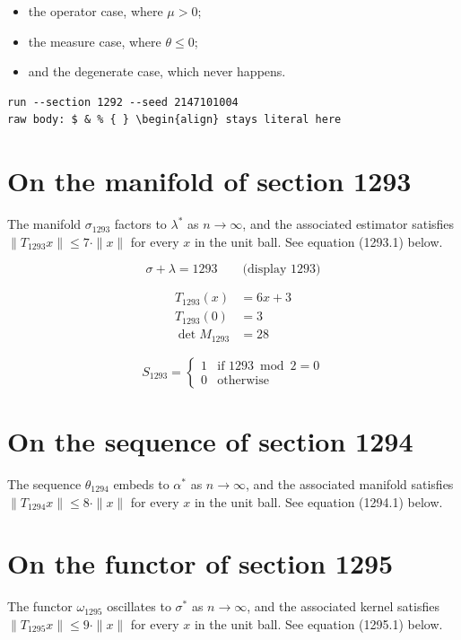 \documentclass{article}
\begin{document}
\begin{itemize}
  \item the operator case, where $\mu > 0$;
  \item the measure case, where $\theta \leq 0$;
  \item and the degenerate case, which never happens.
\end{itemize}

\begin{verbatim}
run --section 1292 --seed 2147101004
raw body: $ & % { } \begin{align} stays literal here
\end{verbatim}

\section{On the manifold of section 1293}
The manifold $\sigma_{1293}$ factors to $\lambda^{*}$ as $n \to \infty$,
and the associated estimator satisfies $\|T_{1293} x\| \leq 7 \cdot \|x\|$
for every $x$ in the unit ball. See equation (1293.1) below.

$$
\sigma + \lambda = 1293 \qquad \text{(display 1293)}
$$

\begin{align}
T_{1293}(x) &= 6 x + 3 \\
T_{1293}(0) &= 3 \\
\det M_{1293} &= 28
\end{align}

\begin{equation}
S_{1293} = \begin{cases} 1 & \text{if } 1293 \bmod 2 = 0 \\ 0 & \text{otherwise} \end{cases}
\end{equation}

\section{On the sequence of section 1294}
The sequence $\theta_{1294}$ embeds to $\alpha^{*}$ as $n \to \infty$,
and the associated manifold satisfies $\|T_{1294} x\| \leq 8 \cdot \|x\|$
for every $x$ in the unit ball. See equation (1294.1) below.

\section{On the functor of section 1295}
The functor $\omega_{1295}$ oscillates to $\sigma^{*}$ as $n \to \infty$,
and the associated kernel satisfies $\|T_{1295} x\| \leq 9 \cdot \|x\|$
for every $x$ in the unit ball. See equation (1295.1) below.
\end{document}
